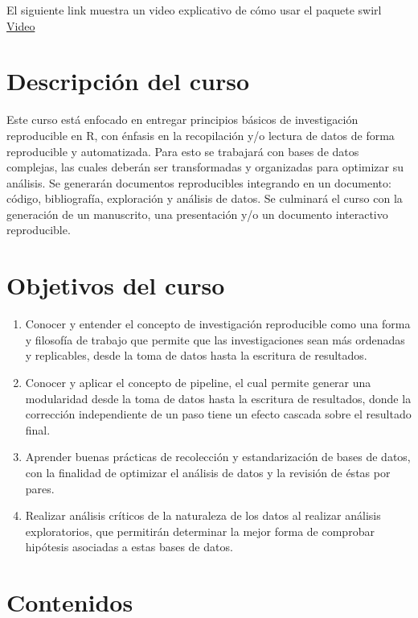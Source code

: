 \documentclass[]{book}
\begin{document}
El siguiente link muestra un video explicativo de cómo usar el paquete
swirl \href{https://youtu.be/w6L7Ye18yPE}{Video}

\hypertarget{descripcion-del-curso}{%
\section{Descripción del curso}\label{descripcion-del-curso}}

Este curso está enfocado en entregar principios básicos de investigación
reproducible en R, con énfasis en la recopilación y/o lectura de datos
de forma reproducible y automatizada. Para esto se trabajará con bases
de datos complejas, las cuales deberán ser transformadas y organizadas
para optimizar su análisis. Se generarán documentos reproducibles
integrando en un documento: código, bibliografía, exploración y análisis
de datos. Se culminará el curso con la generación de un manuscrito, una
presentación y/o un documento interactivo reproducible.

\hypertarget{objetivos-del-curso}{%
\section{Objetivos del curso}\label{objetivos-del-curso}}

\begin{enumerate}
\def\labelenumi{\arabic{enumi}.}
\item
  Conocer y entender el concepto de investigación reproducible como una
  forma y filosofía de trabajo que permite que las investigaciones sean
  más ordenadas y replicables, desde la toma de datos hasta la escritura
  de resultados.
\item
  Conocer y aplicar el concepto de pipeline, el cual permite generar una
  modularidad desde la toma de datos hasta la escritura de resultados,
  donde la corrección independiente de un paso tiene un efecto cascada
  sobre el resultado final.
\item
  Aprender buenas prácticas de recolección y estandarización de bases de
  datos, con la finalidad de optimizar el análisis de datos y la
  revisión de éstas por pares.
\item
  Realizar análisis críticos de la naturaleza de los datos al realizar
  análisis exploratorios, que permitirán determinar la mejor forma de
  comprobar hipótesis asociadas a estas bases de datos.
\end{enumerate}

\hypertarget{contenidos}{%
\section{Contenidos}\label{contenidos}}
\end{document}
